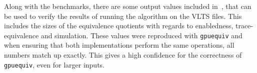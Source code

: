 Along with the benchmarks, there are some output values included
in~\cite{bisping2023process},
that can be used to verify the results of running the algorithm on the VLTS
files.
This includes the sizes of the equivalence quotients with regards to
enabledness, trace-equivalence and simulation.
These values were reproduced with \texttt{gpuequiv}
and when ensuring that both implementations perform the same operations,
all numbers match up exactly.
This gives a high confidence for the correctness of \texttt{gpuequiv},
even for larger inputs.
